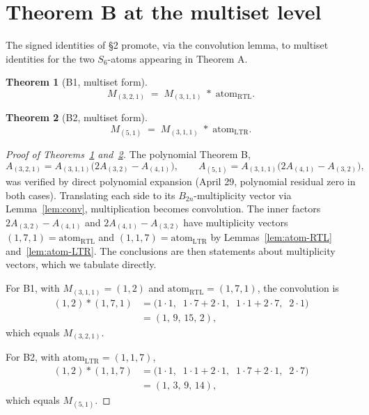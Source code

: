 \documentclass[11pt]{article}
\newtheorem{theorem}{Theorem}
\theoremstyle{definition}
\begin{document}
\section{Theorem B at the multiset level}

The signed identities of §2 promote, via the convolution lemma, to multiset identities for the two $S_6$-atoms appearing in Theorem A.

\begin{theorem}[B1, multiset form]\label{thm:B1}
\[
M_{(3,2,1)} \;=\; M_{(3,1,1)} \;\ast\; \mathrm{atom}_{\mathrm{RTL}}.
\]
\end{theorem}

\begin{theorem}[B2, multiset form]\label{thm:B2}
\[
M_{(5,1)} \;=\; M_{(3,1,1)} \;\ast\; \mathrm{atom}_{\mathrm{LTR}}.
\]
\end{theorem}

\begin{proof}[Proof of Theorems~\ref{thm:B1} and~\ref{thm:B2}]
The polynomial Theorem B,
\[
A_{(3,2,1)} = A_{(3,1,1)}\bigl(2A_{(3,2)} - A_{(4,1)}\bigr), \qquad A_{(5,1)} = A_{(3,1,1)}\bigl(2A_{(4,1)} - A_{(3,2)}\bigr),
\]
was verified by direct polynomial expansion (April 29, polynomial residual zero in both cases). Translating each side to its $B_{2n}$-multiplicity vector via Lemma~\ref{lem:conv}, multiplication becomes convolution. The inner factors $2 A_{(3,2)} - A_{(4,1)}$ and $2 A_{(4,1)} - A_{(3,2)}$ have multiplicity vectors $(1,7,1) = \mathrm{atom}_{\mathrm{RTL}}$ and $(1,1,7) = \mathrm{atom}_{\mathrm{LTR}}$ by Lemmas~\ref{lem:atom-RTL} and~\ref{lem:atom-LTR}. The conclusions are then statements about multiplicity vectors, which we tabulate directly.

For B1, with $M_{(3,1,1)} = (1,2)$ and $\mathrm{atom}_{\mathrm{RTL}} = (1,7,1)$, the convolution is
\begin{align*}
(1,2) \ast (1,7,1) &= \bigl(1\cdot 1,\;\; 1\cdot 7 + 2\cdot 1,\;\; 1\cdot 1 + 2\cdot 7,\;\; 2\cdot 1\bigr)\\
&= (1,\, 9,\, 15,\, 2),
\end{align*}
which equals $M_{(3,2,1)}$.

For B2, with $\mathrm{atom}_{\mathrm{LTR}} = (1,1,7)$,
\begin{align*}
(1,2) \ast (1,1,7) &= \bigl(1\cdot 1,\;\; 1\cdot 1 + 2\cdot 1,\;\; 1\cdot 7 + 2\cdot 1,\;\; 2\cdot 7\bigr)\\
&= (1,\, 3,\, 9,\, 14),
\end{align*}
which equals $M_{(5,1)}$. \qedhere
\end{proof}
\end{document}
